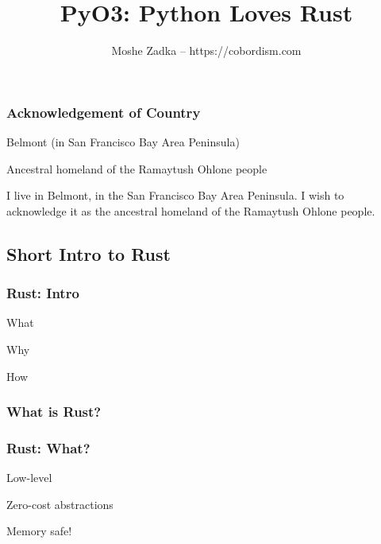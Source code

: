 \usepackage{hyperref}
\usepackage{graphicx}
\usepackage{listings}
\usepackage{textcomp}
\usepackage{fancyvrb}

\newcommand{\passthrough}[1]{\lstset{mathescape=false}#1\lstset{mathescape=true}}
\newcommand{\tightlist}{}

\title{PyO3: Python Loves Rust}
\author{Moshe Zadka -- https://cobordism.com}
\date{}


\begin{titlepage}
\maketitle
\end{titlepage}

\frame{\titlepage}

\begin{frame}
\frametitle{Acknowledgement of Country}

Belmont (in San Francisco Bay Area Peninsula)

Ancestral homeland of the Ramaytush Ohlone people

\end{frame}

I live in Belmont, in the San Francisco Bay Area Peninsula. I wish to
acknowledge it as the ancestral homeland of the Ramaytush Ohlone people.

\hypertarget{short-intro-to-rust}{%
\subsection{Short Intro to Rust}\label{short-intro-to-rust}}

\begin{frame}
\frametitle{Rust: Intro}

\pause

What \pause

Why \pause

How

\end{frame}

\hypertarget{what-is-rust}{%
\subsubsection{What is Rust?}\label{what-is-rust}}

\begin{frame}
\frametitle{Rust: What?}

\pause

Low-level \pause

Zero-cost abstractions \pause

Memory safe!

\end{frame}

